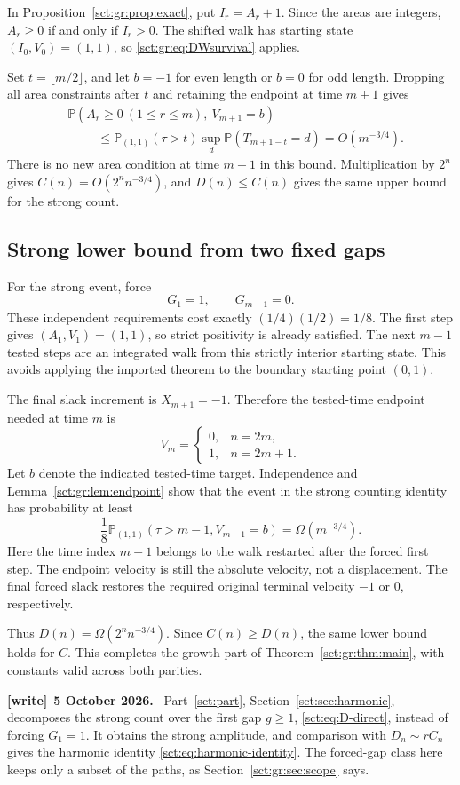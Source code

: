 \documentclass[11pt,letterpaper]{article}
\theoremstyle{definition}\newtheorem{remark}[theorem]{Remark}
\newcommand{\Pp}{\mathbb P}\newcommand{\Ee}{\mathbb E}
\newenvironment{writenote}[1][]{\par\smallskip\begingroup\small
 \noindent\textbf{[write]}\if\relax\detokenize{#1}\relax\else~\textbf{#1.}\fi\ }%
 {\par\endgroup\smallskip}
\begin{document}
In Proposition~\ref{sct:gr:prop:exact}, put $I_r=A_r+1$. Since the areas are integers,
$A_r\ge0$ if and only if $I_r>0$. The shifted walk has starting state
$(I_0,V_0)=(1,1)$, so \eqref{sct:gr:eq:DWsurvival} applies.

Set $t=\lfloor m/2\rfloor$, and let $b=-1$ for even length or $b=0$ for
odd length. Dropping all area constraints after $t$ and retaining the endpoint
at time $m+1$ gives
\begin{align*}
 &\Pp(A_r\ge0\ (1\le r\le m),\ V_{m+1}=b)\\
 &\hspace{1cm}\le\Pp_{(1,1)}(\tau>t)
              \sup_d\Pp(T_{m+1-t}=d)
 =O(m^{-3/4}).
\end{align*}
There is no new area condition at time $m+1$ in this bound. Multiplication by
$2^n$ gives $C(n)=O(2^nn^{-3/4})$, and $D(n)\le C(n)$ gives the same upper
bound for the strong count.

\subsection{Strong lower bound from two fixed gaps}

For the strong event, force
\begin{equation}\label{sct:gr:eq:forced}
 G_1=1,\qquad G_{m+1}=0.
\end{equation}
These independent requirements cost exactly $(1/4)(1/2)=1/8$.
The first step gives $(A_1,V_1)=(1,1)$, so strict positivity is already
satisfied. The next $m-1$ tested steps are an integrated walk from this
strictly interior starting state. This avoids applying the imported theorem
to the boundary starting point $(0,1)$.

The final slack increment is $X_{m+1}=-1$. Therefore the tested-time endpoint
needed at time $m$ is
\[
 V_m=\begin{cases}0,&n=2m,\\1,&n=2m+1.\end{cases}
\]
Let $b$ denote the indicated tested-time target. Independence and
Lemma~\ref{sct:gr:lem:endpoint} show that the event in the strong counting identity
has probability at least
\[
 \frac18\Pp_{(1,1)}(\tau>m-1,V_{m-1}=b)
 =\Omega(m^{-3/4}).
\]
Here the time index $m-1$ belongs to the walk restarted after the forced first
step. The endpoint velocity is still the absolute velocity, not a displacement.
The final forced slack restores the required original terminal velocity
$-1$ or $0$, respectively.

Thus $D(n)=\Omega(2^nn^{-3/4})$. Since $C(n)\ge D(n)$, the same lower bound
holds for $C$. This completes the growth part of Theorem~\ref{sct:gr:thm:main},
with constants valid across both parities.
\begin{writenote}[5 October 2026]
Part~\ref{sct:part}, Section~\ref{sct:sec:harmonic}, decomposes the strong count over the first gap $g\ge1$, \eqref{sct:eq:D-direct}, instead of forcing $G_1=1$. It obtains the strong amplitude, and comparison with $D_n\sim rC_n$ gives the harmonic identity \eqref{sct:eq:harmonic-identity}. The forced-gap class here keeps only a subset of the paths, as Section~\ref{sct:gr:sec:scope} says.
\end{writenote}
\end{document}
